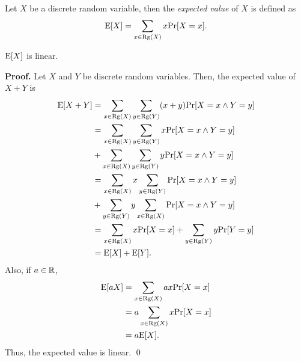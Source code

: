 Let $X$ be a discrete random variable, then the \textit{expected value} of $X$ is defined as 
\[\mathrm{E}[X] = \sum_{x \in \mathrm{Rg}(X)} x\mathrm{Pr}[X = x].\]
\begin{theorem}
    \(\mathrm{E}[X]\) is linear. 
\end{theorem}
\textbf{Proof. } Let $X$ and $Y$ be discrete random variables. Then, the expected value of $X + Y$ is
\begin{align*}
    \mathrm{E}[X + Y] &= \sum_{x \in \mathrm{Rg}(X)} \sum_{y \in \mathrm{Rg}(Y)} (x + y)\mathrm{Pr}[X = x \wedge Y = y] \\
    &= \sum_{x \in \mathrm{Rg}(X)} \sum_{y \in \mathrm{Rg}(Y)} x\mathrm{Pr}[X = x \wedge Y = y] \\&+ \sum_{x \in \mathrm{Rg}(X)} \sum_{y \in \mathrm{Rg}(Y)} y\mathrm{Pr}[X = x \wedge Y = y] \\
    &= \sum_{x \in \mathrm{Rg}(X)} x\sum_{y \in \mathrm{Rg}(Y)} \mathrm{Pr}[X = x \wedge Y = y] \\&+ \sum_{y \in \mathrm{Rg}(Y)} y\sum_{x \in \mathrm{Rg}(X)} \mathrm{Pr}[X = x \wedge Y = y] \\
    &= \sum_{x \in \mathrm{Rg}(X)} x\mathrm{Pr}[X = x] + \sum_{y \in \mathrm{Rg}(Y)} y\mathrm{Pr}[Y = y] \\
    &= \mathrm{E}[X] + \mathrm{E}[Y].
\end{align*}
Also, if $a \in \mathbb{R}$,
\begin{align*}
    \mathrm{E}[aX] &= \sum_{x \in \mathrm{Rg}(X)} ax\mathrm{Pr}[X = x] \\
    &= a\sum_{x \in \mathrm{Rg}(X)} x\mathrm{Pr}[X = x] \\
    &= a\mathrm{E}[X].  
\end{align*}
Thus, the expected value is linear. \qed \par

